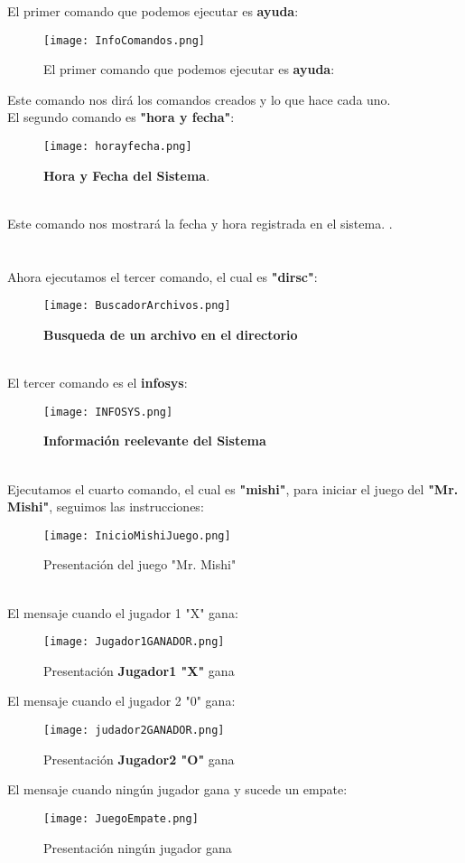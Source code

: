 \documentclass[titlepage]{article}
\begin{document}
El primer comando que podemos ejecutar es \textbf{ayuda}:
\begin{figure}[H]
    \centering
    \texttt{[image: InfoComandos.png]}
    \caption{El primer comando que podemos ejecutar es \textbf{ayuda}:}
    \label{fig:ejemplo}
\end{figure}
Este comando nos dirá los comandos creados y lo que hace cada uno.\\

El segundo comando es \textbf{"hora y fecha"}:
\begin{figure}[H]
    \centering
    \texttt{[image: horayfecha.png]}
    \caption{\textbf{Hora y Fecha del Sistema}.}
    \label{fig:ejemplo}
\end{figure}\\
Este comando nos mostrará la fecha y hora registrada en el sistema.
.\\\\\\

Ahora ejecutamos el tercer comando, el cual es \textbf{"dirsc"}:
\begin{figure}[H]
    \centering
    \texttt{[image: BuscadorArchivos.png]}
    \caption{\textbf{Busqueda de un archivo en el directorio}}
    \label{fig:ejemplo}
\end{figure}\\


El tercer comando es el \textbf{infosys}:
\begin{figure}[H]
    \centering
    \texttt{[image: INFOSYS.png]}
    \caption{\textbf{Información reelevante del Sistema}}
    \label{fig:ejemplo}
\end{figure}\\

Ejecutamos el cuarto comando, el cual es \textbf{"mishi"}, para iniciar el juego del \textbf{"Mr. Mishi"}, seguimos las instrucciones:
\begin{figure}[H]
    \centering
    \texttt{[image: InicioMishiJuego.png]}
    \caption{Presentación del juego "Mr. Mishi"}
    \label{fig:ejemplo}
\end{figure}\\

El mensaje cuando el jugador 1 "X" gana:
\begin{figure}[H]
    \centering
    \texttt{[image: Jugador1GANADOR.png]}
    \caption{Presentación \textbf{Jugador1 "X"} gana}
    \label{fig:ejemplo}
\end{figure}
El mensaje cuando el jugador 2 "0" gana:
\begin{figure}[H]
    \centering
    \texttt{[image: judador2GANADOR.png]}
    \caption{Presentación \textbf{Jugador2 "O"} gana}
    \label{fig:ejemplo}
\end{figure}
El mensaje cuando ningún jugador gana y sucede un empate:
\begin{figure}[H]
    \centering
    \texttt{[image: JuegoEmpate.png]}
    \caption{Presentación ningún jugador gana}
    \label{fig:ejemplo}
\end{figure}
\end{document}
